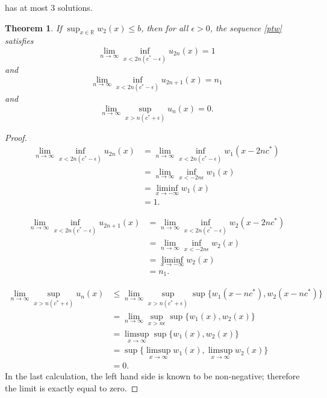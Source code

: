 \documentclass[11pt]{article}
\newtheorem{thm}{Theorem}
\theoremstyle{definition}
\numberwithin{equation}{section}
\numberwithin{thm}{section}
\renewcommand{\b}{b}
\newcommand{\m}{n_1}
\begin{document}
has at most 3 solutions.

\begin{thm}  \label{theorem2}
If $\sup_{x\in\mathbb R}w_2(x)\leq \b$, then for all $\epsilon>0$, the sequence \ref{ptw} satisfies
\begin{equation}
\lim_{n\to\infty}\inf_{x<2n(c^*-\epsilon)}u_{2n}(x)=1
\end{equation}
and
\begin{equation}
\lim_{n\to\infty}\inf_{x<2n(c^*-\epsilon)}u_{2n+1}(x)=\m
\end{equation}
and 
\begin{equation}
\lim_{n\to\infty}\sup_{x>n(c^*+\epsilon)}u_n(x)=0.
\end{equation}
\end{thm}

\begin{proof}
\begin{equation} \begin{aligned}
\lim_{n\to\infty}\inf_{x<2n(c^*-\epsilon)}u_{2n}(x)
&= \lim_{n\to\infty}\inf_{x<2n(c^*-\epsilon)}w_1(x-2nc^*) \\
&= \lim_{n\to\infty}\inf_{x<-2n\epsilon}w_1(x) \\
&= \liminf_{x\to-\infty}w_1(x) \\ &= 1.
\end{aligned} \end{equation}

\begin{equation} \begin{aligned}
\lim_{n\to\infty}\inf_{x<2n(c^*-\epsilon)}u_{2n+1}(x)
&= \lim_{n\to\infty}\inf_{x<2n(c^*-\epsilon)}w_2(x-2nc^*) \\
&= \lim_{n\to\infty}\inf_{x<-2n\epsilon}w_2(x) \\
&= \liminf_{x\to-\infty}w_2(x) \\ &= \m.
\end{aligned} \end{equation}

\begin{equation} \begin{aligned}
\lim_{n\to\infty} \sup_{x>n(c^*+\epsilon)} u_n(x) 
&\leq \lim_{n\to\infty} \sup_{x>n(c^*+\epsilon)} \sup\{w_1(x-nc^*),w_2(x-nc^*)\} \\
&= \lim_{n\to\infty} \sup_{x>n\epsilon} \sup\{w_1(x),w_2(x)\} \\
&= \limsup_{x\to\infty} \sup\{w_1(x),w_2(x)\} \\ 
&= \sup\{\limsup_{x\to\infty} w_1(x),\limsup_{x\to\infty} w_2(x)\} \\
&= 0.
\end{aligned} \end{equation}
In the last calculation, the left hand side is known to be non-negative; therefore the limit is exactly equal to zero.
\end{proof}
\end{document}
